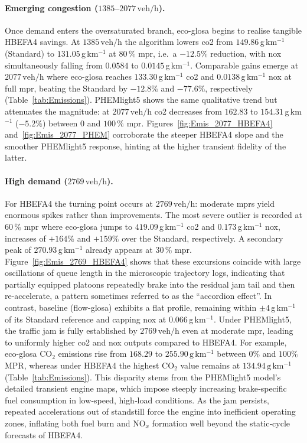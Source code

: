 \paragraph{Emerging congestion ($1385$--$2077\,\mathrm{veh/h}$).}
Once demand enters the oversaturated branch, \ac{eco-glosa} begins to realise tangible HBEFA4 savings. At $1385\,\mathrm{veh/h}$ the algorithm lowers \ac{co2} from $149.86$\,g\,km$^{-1}$ (Standard) to $131.05$\,g\,km$^{-1}$ at $80\,\%$ \ac{mpr}, i.e.\ a ${-12.5\%}$ reduction, with \ac{nox} simultaneously falling from $0.0584$ to $0.0145$\,g\,km$^{-1}$. Comparable gains emerge at $2077\,\mathrm{veh/h}$ where \ac{eco-glosa} reaches $133.30$\,g\,km$^{-1}$ \ac{co2} and $0.0138$\,g\,km$^{-1}$ \ac{nox} at full \ac{mpr}, beating the Standard by ${-12.8\%}$ and ${-77.6\%}$, respectively (Table~\ref{tab:Emissions}).  PHEMlight5 shows the same qualitative trend but attenuates the magnitude: at $2077\,\mathrm{veh/h}$ \ac{co2} decreases from $162.83$ to $154.31$\,g\,km$^{-1}$ (${ -5.2\%}$) between $0$ and $100\,\%$ \ac{mpr}. Figures~\ref{fig:Emis_2077_HBEFA4} and~\ref{fig:Emis_2077_PHEM} corroborate the steeper HBEFA4 slope and the smoother PHEMlight5 response, hinting at the higher transient fidelity of the latter.

\paragraph{High demand ($2769\,\mathrm{veh/h}$).}
For HBEFA4 the turning point occurs at $2769\,\mathrm{veh/h}$: moderate \acp{mpr} yield enormous spikes rather than improvements. The most severe outlier is recorded at $60\,\%$ \ac{mpr} where \ac{eco-glosa} jumps to $419.09$\,g\,km$^{-1}$ \ac{co2} and $0.173$\,g\,km$^{-1}$ \ac{nox}, increases of $+164\%$ and $+159\%$ over the Standard, respectively. A secondary peak of $270.93$\,g\,km$^{-1}$ already appears at $30\,\%$ \ac{mpr}. Figure~\ref{fig:Emis_2769_HBEFA4} shows that these excursions coincide with large oscillations of queue length in the microscopic trajectory logs, indicating that partially equipped platoons repeatedly brake into the residual jam tail and then re-accelerate, a pattern sometimes referred to as the \enquote{accordion effect}. In contrast, baseline (\ac{flow-glosa}) exhibits a flat profile, remaining within ${\pm}4$\,g\,km$^{-1}$ of its Standard reference and capping \ac{nox} at $0.066$\,g\,km$^{-1}$.
\mynewline
Under PHEMlight5, the traffic jam is fully established by $2769\,\mathrm{veh/h}$ even at moderate \ac{mpr}, leading to uniformly higher \ac{co2} and \ac{nox} outputs compared to HBEFA4. For example, \ac{eco-glosa} CO$_2$ emissions rise from $168.29$ to $255.90\,\mathrm{g\,km^{-1}}$ between $0\%$ and $100\%$ MPR, whereas under HBEFA4 the highest CO$_2$ value remains at $134.94\,\mathrm{g\,km^{-1}}$ (Table~\ref{tab:Emissions}). This disparity stems from the PHEMlight5 model’s detailed transient engine maps, which impose steeply increasing brake‐specific fuel consumption in low‐speed, high‐load conditions.  As the jam persists, repeated accelerations out of standstill force the engine into inefficient operating zones, inflating both fuel burn and NO$_x$ formation well beyond the static‐cycle forecasts of HBEFA4.

